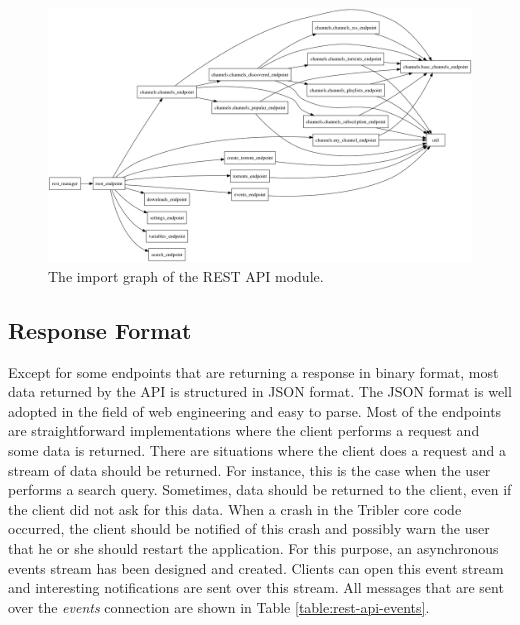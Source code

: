\begin{figure}[h!]
	\centering
	\includegraphics[width=1.0\columnwidth]{images/improving_qa/importgraph_api}
	\caption{The import graph of the REST API module.}
	\label{fig:importgraph-api}
\end{figure}

\subsection{Response Format}
Except for some endpoints that are returning a response in binary format, most data returned by the API is structured in JSON format. The JSON format is well adopted in the field of web engineering and easy to parse. Most of the endpoints are straightforward implementations where the client performs a request and some data is returned. There are situations where the client does a request and a stream of data should be returned. For instance, this is the case when the user performs a search query. Sometimes, data should be returned to the client, even if the client did not ask for this data. When a crash in the Tribler core code occurred, the client should be notified of this crash and possibly warn the user that he or she should restart the application. For this purpose, an asynchronous events stream has been designed and created. Clients can open this event stream and interesting notifications are sent over this stream. All messages that are sent over the \emph{events} connection are shown in Table \ref{table:rest-api-events}.\\

